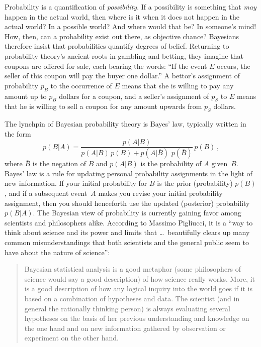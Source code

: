 \documentclass[smallextended]{svjour3}
\newcommand{\be}{\begin{equation}}
\newcommand{\ee}{\end{equation}}
\newcommand{\bq}{\begin{quote}}
\newcommand{\eq}{\end{quote}}
\begin{document}
Probability is a quantification of \emph{possibility}. If a possibility is something that \emph{may} happen in the actual world, then where is it when it does not happen in the actual world? In a possible world? And where would that be? In someone's mind! How, then, can a probability exist out there, as objective chance? Bayesians therefore insist that probabilities quantify degrees of belief. Returning to probability theory's ancient roots in {gambling} and {betting}, they imagine that coupons are offered for sale, each bearing the words: ``If the event $E$ occurs, the seller of this coupon will pay the buyer one dollar.'' A bettor's assignment of probability $p_B$ to the occurrence of $E$ means that she is willing to pay any amount up to $p_B$ dollars for a coupon, and a seller's assignment of $p_S$ to $E$ means that he is willing to sell a coupon for any amount upwards from $p_S$ dollars.

The lynchpin of Bayesian probability theory is {Bayes' law}, typically written in the form
\be
p(B|A) = \frac{p(A|B)}{p(A|B)\,p(B)+p(A|\overline{B})\,\,p(\overline{B})}
\,p(B)\,,
\label{Bayes}
\ee
where $\overline{B}$ is the negation of $B$ and $p(A|B)$ is the probability of $A$ given~$B$. Bayes' law is a rule for updating personal probability assignments in the light of new information. If your initial probability for $B$ is the prior (probability) $p(B)$, and if a subsequent event~$A$ makes you revise your initial probability assignment, then you should henceforth use the updated (posterior) probability $p(B|A)$. The Bayesian view of probability is currently gaining favor among scientists and philosophers alike. According to Massimo {Pigliucci},\cite{Pigliucci} it is a ``way to think about science and its power and limits that \dots\ beautifully clears up many common misunderstandings that both scientists and the general public seem to have about the nature of science'':
\bq
Bayesian statistical analysis is a good metaphor (some philosophers of science would say a good description) of how science really works. More, it is a good description of how any logical inquiry into the world goes if it is based on a combination of hypotheses and data. The scientist (and in general the rationally thinking person) is always evaluating several hypotheses on the basis of her previous understanding and knowledge on the one hand and on new information gathered by observation or experiment on the other hand.
\eq
\end{document}
